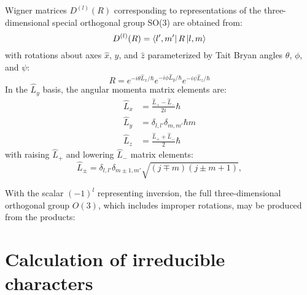 \documentclass[twocolumn,showpacs,preprintnumbers,superscriptaddress,prb,floatfix,aps,10pt]{revtex4-1}
\begin{document}
Wigner matrices $D^{(l)}(R)$ corresponding to representations of the three-dimensional special orthogonal group SO(3) are obtained from:\cite{martin_electronic_2004}
\begin{equation}
\label{eq:imselfenergy}
D^{(l)}(R) = \bra{l',m'} R \ket{l,m}
\end{equation}
with rotations about axes $\hat{x}$, $\hat{y}$, and $\hat{z}$ parameterized by Tait Bryan angles $\theta$, $\phi$, and $\psi$:
\begin{equation}
R = e^{-i\theta\hat{L}_x/\hbar} e^{-i\phi\hat{L}_y/\hbar} e^{-i\psi\hat{L}_z/\hbar}
\end{equation}
%
In the $\hat{L}_y$ basis, the angular momenta matrix elements are:\cite{shankar_fundamentals_2014}
\begin{align}
\label{eq:angular_momenta}
\hat{L}_x & = \frac{\hat{L}_{+}-\hat{L}_{-}}{2i} \hbar \\
\hat{L}_y & = \delta_{l,l'}\delta_{m,m'} \hbar m \\
\hat{L}_z & = \frac{\hat{L}_{+}+\hat{L}_{-}}{2} \hbar
\end{align}
with raising $\hat{L}_+$ and lowering $\hat{L}_-$ matrix elements:
\begin{equation}
\label{eq:raising_lowering_operator}
\hat{L}_{\pm} = \delta_{l,l'}\delta_{m\pm1,m'} \sqrt{(j\mp m)(j\pm m+1)} ,
\end{equation}

With the scalar $(-1)^l$ representing inversion, the full three-dimensional orthogonal group $O(3)$, which includes improper rotations, may be produced from the products:





%
%
\section{Calculation of irreducible characters}
\end{document}
